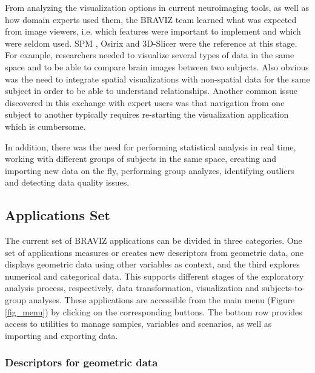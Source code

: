 \documentclass{frontiersHLTH}
\begin{document}
From analyzing the visualization options in current neuroimaging tools, as well as how domain experts used them, the BRAVIZ team learned what was expected from image viewers, i.e. which features were important to implement and which were seldom used. SPM \cite{friston_statistical_2007}, Osirix \cite{rosset_osirix:_2004} and 3D-Slicer \cite{fedorov_3d_2012} were the reference at this stage. For example, researchers needed to visualize several types of data in the same space and to be able to compare brain images between two subjects. Also obvious was the need to integrate spatial visualizations with non-spatial data for the same subject in order to be able to understand relationships. Another common issue discovered in this exchange with expert users was that navigation from one subject to another typically requires re-starting the visualization application which is cumbersome. 

In addition, there was the need for performing statistical analysis in real time, working with different groups of subjects in the same space, creating and importing new data on the fly, performing group analyzes, identifying outliers and detecting data quality issues. 


\subsection{Applications Set}
\label{braviz_apps}

The current set of BRAVIZ applications can be divided in three categories. One set of applications measures or creates new descriptors from geometric data, one displays geometric data using other variables as context, and the third explores numerical and categorical data. This supports different stages of the exploratory analysis process, respectively, data transformation, visualization and subjects-to-group analyses. These applications are accessible from the main menu (Figure \ref{fig_menu}) by clicking on the corresponding buttons. The bottom row provides access to utilities to manage samples, variables and scenarios, as well as importing and exporting data. 

\subsubsection{Descriptors for geometric data}
\end{document}
